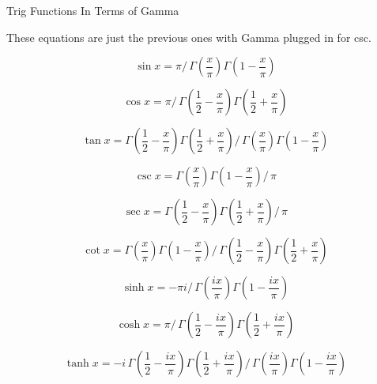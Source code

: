 \documentclass[12pt]{article}
\begin{document}
\pagebreak
\begin{section}{Trig Functions In Terms of Gamma}
	
	\noindent These equations are just the previous ones with Gamma plugged in for csc.

	\begin{equation}\sin x=\pi\big/\,\Gamma\left(\dfrac x\pi\right)\Gamma\left(1-\dfrac x\pi\right)\end{equation}

	\begin{equation}
		\cos x=\pi\big/\,\Gamma\left(\dfrac12-\dfrac x\pi\right)\Gamma\left(\dfrac12+\dfrac x\pi\right)
	\end{equation}

	\begin{equation}
		\tan x=\Gamma\left(\dfrac12-\dfrac x\pi\right)\Gamma\left(\dfrac12+\dfrac x\pi\right)\big/\,\Gamma\left(\dfrac x\pi\right)\Gamma\left(1-\dfrac x\pi\right)
	\end{equation}
	
	\begin{equation}\csc x=\Gamma\left(\dfrac x\pi\right)\Gamma\left(1-\dfrac x\pi\right)\big/\,\pi\end{equation}

	\begin{equation}\sec x=\Gamma\left(\dfrac12-\dfrac x\pi\right)\Gamma\left(\dfrac12+\dfrac x\pi\right)\big/\,\pi\end{equation}

	\begin{equation}
		\cot x=\Gamma\left(\dfrac x\pi\right)\Gamma\left(1-\dfrac x\pi\right)\big/\,\Gamma\left(\dfrac12-\dfrac x\pi\right)\Gamma\left(\dfrac12+\dfrac x\pi\right)
	\end{equation}


	\begin{equation}\sinh x=-\pi i\big/\,\Gamma\left(\dfrac{ix}\pi\right)\Gamma\left(1-\dfrac{ix}\pi\right)\end{equation}

	\begin{equation}
		\cosh x=\pi\big/\,\Gamma\left(\dfrac12-\dfrac{ix}\pi\right)\Gamma\left(\dfrac12+\dfrac{ix}\pi\right)
	\end{equation}

	\begin{equation}
		\tanh x=-i\,\Gamma\left(\dfrac12-\dfrac{ix}\pi\right)\Gamma\left(\dfrac12+\dfrac{ix}\pi\right)\big/\,\Gamma\left(\dfrac{ix}\pi\right)\Gamma\left(1-\dfrac{ix}\pi\right)
	\end{equation}


\end{section}
\end{document}
